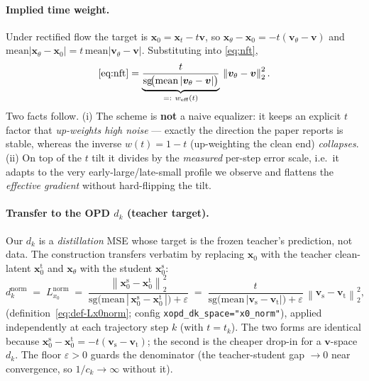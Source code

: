 \documentclass[11pt,a4paper]{article}
\newcommand{\norm}[1]{\left\lVert #1 \right\rVert}
\newcommand{\dk}{d_k}
\begin{document}
\paragraph{Implied time weight.} Under rectified flow the target is $\bm{x}_0=\bm{x}_t-t\bm{v}$, so
$\bm{x}_\theta-\bm{x}_0=-t(\bm{v}_\theta-\bm{v})$ and $\mathrm{mean}|\bm{x}_\theta-\bm{x}_0|=t\,\mathrm{mean}|\bm{v}_\theta-\bm{v}|$.
Substituting into \eqref{eq:nft},
\begin{equation}\label{eq:weff}
  \eqref{eq:nft}=\underbrace{\frac{t}{\mathrm{sg}\!\big(\mathrm{mean}\,|\bm{v}_\theta-\bm{v}|\big)}}_{\;=:~w_{\mathrm{eff}}(t)\;}\,\norm{\bm{v}_\theta-\bm{v}}_2^2 .
\end{equation}
Two facts follow. (i) The scheme is \textbf{not} a naive equalizer: it keeps an explicit $t$ factor that
\emph{up-weights high noise} --- exactly the direction the paper reports is stable, whereas the inverse
$w(t)=1-t$ (up-weighting the clean end) \emph{collapses}. (ii) On top of the $t$ tilt it divides by the
\emph{measured} per-step error scale, i.e.\ it adapts to the very early-large/late-small profile we observe
and flattens the \emph{effective gradient} without hard-flipping the tilt.

\paragraph{Transfer to the OPD $d_k$ (teacher target).} Our $d_k$ is a \emph{distillation} MSE whose
target is the frozen teacher's prediction, not data. The construction transfers verbatim by replacing
$\bm{x}_0$ with the teacher clean-latent $\bm{x}_0^{\mathrm{t}}$ and $\bm{x}_\theta$ with the student
$\bm{x}_0^{\mathrm{s}}$:
\begin{equation}\label{eq:opdnorm}
  \dk^{\mathrm{norm}}
  \;=\;
  L_{x_0}^{\mathrm{norm}}
  \;=\;
  \frac{\norm{\bm{x}_0^{\mathrm{s}}-\bm{x}_0^{\mathrm{t}}}_2^2}
       {\mathrm{sg}\!\big(\mathrm{mean}\,|\,\bm{x}_0^{\mathrm{s}}-\bm{x}_0^{\mathrm{t}}\,|\big)+\varepsilon}
  \;=\;
  \frac{t}{\mathrm{sg}\!\big(\mathrm{mean}\,|\bm{v}_{\mathrm{s}}-\bm{v}_{\mathrm{t}}|\big)+\varepsilon}\,
  \norm{\bm{v}_{\mathrm{s}}-\bm{v}_{\mathrm{t}}}_2^2 ,
\end{equation}
(definition~\eqref{eq:def-Lx0norm}; config \texttt{xopd\_dk\_space="x0\_norm"}),
applied independently at each trajectory step $k$ (with $t=t_k$). The two forms are identical because
$\bm{x}_0^{\mathrm{s}}-\bm{x}_0^{\mathrm{t}}=-t(\bm{v}_{\mathrm{s}}-\bm{v}_{\mathrm{t}})$; the second is the
cheaper drop-in for a $\bm{v}$-space $d_k$. The floor $\varepsilon>0$ guards the denominator (the
teacher-student gap $\to 0$ near convergence, so $1/c_k\to\infty$ without it).
\end{document}
